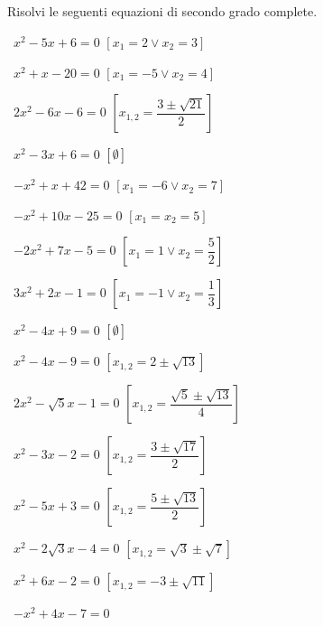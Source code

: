 \subsection*{}

\begin{esercizio}[\Ast]
 \label{ese:3.12}
Risolvi le seguenti equazioni di secondo grado complete.
\begin{multicols}{2}
 \begin{enumeratea}
 \item~\(x^{2}-5 x + 6=0\)
  \hfill\(\left[x_{1} = 2 \vee x_{2} = 3\right]\)
 \item~\(x^{2} + x-20=0\)
  \hfill\(\left[x_{1} =-5 \vee x_{2} = 4\right]\)
 \item~\(2 x^{2}-6 x-6=0\)
  \hfill\(\left[x_{1,2} = \dfrac{3 \pm \sqrt{21}}{2}\right]\)
 \item~\(x^{2}-3 x + 6=0\)
  \hfill\(\left[\emptyset\right]\)
 \item~\(- x^{2} + x + 42=0\)
  \hfill\(\left[x_{1} =-6 \vee x_{2} = 7\right]\)
 \item~\(- x^{2} + 10 x-25=0\)
  \hfill\(\left[x_{1} = x_{2} = 5\right]\)
 \item~\(- 2 x^{2} + 7 x-5=0\)
  \hfill\(\left[x_{1} = 1 \vee x_{2} = \dfrac{5}{2}\right]\)
 \item~\(3 x^{2} + 2 x-1=0\)
  \hfill\(\left[x_{1} =-1 \vee x_{2} = \dfrac{1}{3}\right]\)
 \item~\(x^{2}-4 x + 9 = 0\)
  \hfill\(\left[\emptyset\right]\)
 \item~\(x^{2}-4 x-9 = 0\)
  \hfill\(\left[x_{1,2} = 2 \pm \sqrt{13}\right]\)
 \item~\(2 x^{2}-\sqrt{5} x-1 = 0\)
  \hfill\(\left[x_{1,2} = \dfrac{\sqrt{5} \pm \sqrt{13}}{4}\right]\)
 \item~\(x^{2}-3 x-2=0\)
  \hfill\(\left[x_{1,2} = \dfrac{3 \pm \sqrt{17}}{2}\right]\)
 \item~\(x^{2}-5 x + 3 = 0\)
  \hfill\(\left[x_{1,2} = \dfrac{5 \pm \sqrt{13}}{2}\right]\)
 \item~\(x^{2}-2 \sqrt{3} x-4=0\)
  \hfill\(\left[x_{1,2} = \sqrt{3} \pm \sqrt{7}\right]\)
 \item~\(x^{2} + 6 x-2 = 0\)
  \hfill\(\left[x_{1,2} =-3 \pm \sqrt{11}\right]\)
 \item~\(- x^{2} + 4 x-7=0\)

\end{enumeratea}
\end{multicols}
\end{esercizio}

